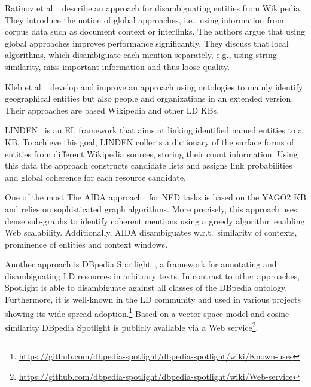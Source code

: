 
Ratinov et al.~\cite{rat:rot} describe an approach for disambiguating entities from Wiki\-pedia. 
They introduce the notion of global approaches, i.e., using information from corpus data such as document context or interlinks. 
The authors argue that using global approaches improves performance significantly. 
They discuss that local algorithms, which disambiguate each mention separately, e.g., using string similarity, miss important information and thus loose quality. 

Kleb et al.~\cite{Kleb11WIMS,KlebESWC10} develop and improve an approach using ontologies to mainly identify geographical entities but also people and organizations in an extended version. 
Their approaches are based Wikipedia and other \ac{LD} \ac{KB}s. 

LINDEN~\cite{LINDEN} is an \ac{EL} framework that aims at linking identified named entities to a \ac{KB}.
To achieve this goal, LINDEN collects a dictionary of the surface forms of entities from different Wikipedia sources, storing their count information.
Using this data the approach constructs candidate lists and assigns link probabilities and global coherence for each resource candidate.

One of the most 
The AIDA approach~\cite{AIDA} for \ac{NED} tasks is based on the YAGO2 \ac{KB} and relies on sophisticated graph algorithms. 
More precisely, this approach uses dense sub-graphs to identify coherent mentions using a greedy algorithm enabling Web scalability. 
Additionally, AIDA disambiguates w.r.t.~similarity of contexts, prominence of entities and context windows.

Another approach is DBpedia Spotlight~\cite{spotlight}, a framework for annotating and disambiguating \ac{LD} resources in arbitrary texts.
In contrast to other approaches, Spotlight is able to disambiguate against all classes of the DBpedia ontology.
Furthermore, it is well-known in the \ac{LD} community and used in various projects showing its wide-spread adoption.\footnote{\url{https://github.com/dbpedia-spotlight/dbpedia-spotlight/wiki/Known-uses}}
Based on a vector-space model and cosine similarity DBpedia Spotlight is publicly available via a Web service\footnote{\url{https://github.com/dbpedia-spotlight/dbpedia-spotlight/wiki/Web-service}}.

